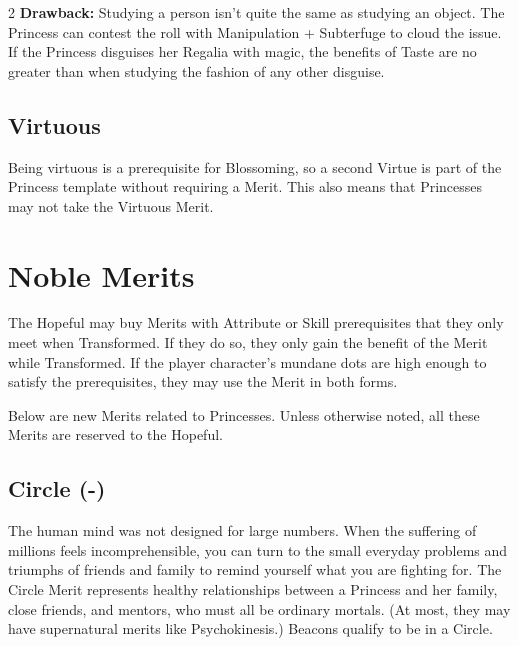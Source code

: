 \begin{multicols}{2}
\textbf{Drawback:} Studying a person isn't quite the same as studying an object. The Princess can contest the roll with Manipulation + Subterfuge to cloud the issue. If the Princess disguises her Regalia with magic, the benefits of Taste are no greater than when studying the fashion of any other disguise.

\subsection*{Virtuous}

Being virtuous is a prerequisite for Blossoming, so a second Virtue is part of the Princess template without requiring a Merit. This also means that Princesses may not take the Virtuous Merit.


\section*{Noble Merits} 
The Hopeful may buy Merits with Attribute or Skill prerequisites that they only meet when Transformed. If they do so, they only gain the benefit of the Merit while Transformed. If the player character's mundane dots are high enough to satisfy the prerequisites, they may use the Merit in both forms.

Below are new Merits related to Princesses. Unless otherwise noted, all these Merits are reserved to the Hopeful. 

\subsection*{Circle (\textbullet\nobreak\hspace{.16667em}-\nobreak\hspace{.16667em}\textbullet\textbullet\textbullet\textbullet\textbullet)}

The human mind was not designed for large numbers. When the suffering of millions feels incomprehensible, you can turn to the small everyday problems and triumphs of friends and family to remind yourself what you are fighting for. The Circle Merit represents healthy relationships between a Princess and her family, close friends, and mentors, who must all be ordinary mortals. (At most, they may have supernatural merits like Psychokinesis.) Beacons qualify to be in a Circle.


\end{multicols}
